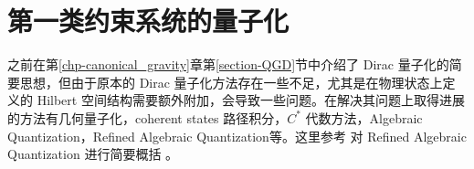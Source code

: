 	\section{第一类约束系统的量子化}

		\label{sec-Quantization}
		之前在第\ref{chp-canonical_gravity}章第\ref{section-QGD}节中介绍了 Dirac 量子化的简要思想，但由于原本的 Dirac 量子化方法存在一些不足，尤其是在物理状态上定义的 Hilbert 空间结构需要额外附加，会导致一些问题。在解决其问题上取得进展的方法有几何量子化，coherent states 路径积分，$C^*$ 代数方法，Algebraic Quantization，Refined Algebraic Quantization等。这里参考 \cite{Han2005,Thiemann0210094, Thiemann2007,arXiv9812024} 对 Refined Algebraic Quantization 进行简要概括
		。
		
